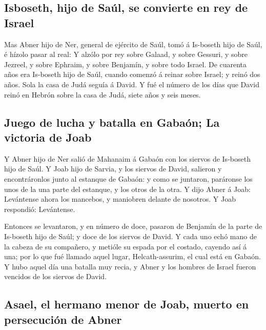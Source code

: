 \hypertarget{isboseth-hijo-de-sauxfal-se-convierte-en-rey-de-israel}{%
\subsection{Isboseth, hijo de Saúl, se convierte en rey de
Israel}\label{isboseth-hijo-de-sauxfal-se-convierte-en-rey-de-israel}}

 Mas Abner hijo de Ner, general de ejército de Saúl, tomó á
Is-boseth hijo de Saúl, é hízolo pasar al real:  Y alzólo
por rey sobre Galaad, y sobre Gessuri, y sobre Jezreel, y sobre Ephraim,
y sobre Benjamín, y sobre todo Israel.  De cuarenta años
era Is-boseth hijo de Saúl, cuando comenzó á reinar sobre Israel; y
reinó dos años. Sola la casa de Judá seguía á David.  Y fué
el número de los días que David reinó en Hebrón sobre la casa de Judá,
siete años y seis meses.

\hypertarget{juego-de-lucha-y-batalla-en-gabauxf3n-la-victoria-de-joab}{%
\subsection{Juego de lucha y batalla en Gabaón; La victoria de
Joab}\label{juego-de-lucha-y-batalla-en-gabauxf3n-la-victoria-de-joab}}

 Y Abner hijo de Ner salió de Mahanaim á Gabaón con los
siervos de Is-boseth hijo de Saúl.  Y Joab hijo de Sarvia,
y los siervos de David, salieron y encontráronlos junto al estanque de
Gabaón: y como se juntaron, paráronse los unos de la una parte del
estanque, y los otros de la otra.  Y dijo Abner á Joab:
Levántense ahora los mancebos, y maniobren delante de nosotros. Y Joab
respondió: Levántense.

 Entonces se levantaron, y en número de doce, pasaron de
Benjamín de la parte de Is-boseth hijo de Saúl; y doce de los siervos de
David.  Y cada uno echó mano de la cabeza de su compañero,
y metióle su espada por el costado, cayendo así á una; por lo que fué
llamado aquel lugar, Helcath-assurim, el cual está en Gabaón.
 Y hubo aquel día una batalla muy recia, y Abner y los
hombres de Israel fueron vencidos de los siervos de David.

\hypertarget{asael-el-hermano-menor-de-joab-muerto-en-persecuciuxf3n-de-abner}{%
\subsection{Asael, el hermano menor de Joab, muerto en persecución de
Abner}\label{asael-el-hermano-menor-de-joab-muerto-en-persecuciuxf3n-de-abner}}

